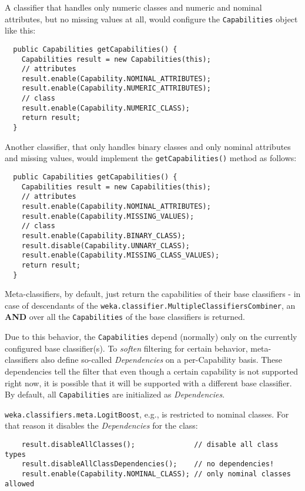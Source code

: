 \newpage
{}
A classifier that handles only numeric classes and numeric and nominal
attributes, but no missing values at all, would configure the
\texttt{Capabilities} object like this:
\begin{verbatim}
  public Capabilities getCapabilities() {
    Capabilities result = new Capabilities(this);
    // attributes
    result.enable(Capability.NOMINAL_ATTRIBUTES);
    result.enable(Capability.NUMERIC_ATTRIBUTES);
    // class
    result.enable(Capability.NUMERIC_CLASS);
    return result;
  }
\end{verbatim}
Another classifier, that only handles binary classes and only nominal
attributes and missing values, would implement the \texttt{getCapabilities()}
method as follows:
\begin{verbatim}
  public Capabilities getCapabilities() {
    Capabilities result = new Capabilities(this);
    // attributes
    result.enable(Capability.NOMINAL_ATTRIBUTES);
    result.enable(Capability.MISSING_VALUES);
    // class
    result.enable(Capability.BINARY_CLASS);
    result.disable(Capability.UNNARY_CLASS);
    result.enable(Capability.MISSING_CLASS_VALUES);
    return result;
  }
\end{verbatim}

Meta-classifiers, by default, just return the capabilities of their base
classifiers - in case of descendants of the
\texttt{weka.classifier.MultipleClassifiersCombiner}, an \textbf{AND} over all
the \texttt{Capabilities} of the base classifiers is returned.

Due to this behavior, the \texttt{Capabilities} depend (normally) only on the
currently configured base classifier(s). To \textit{soften} filtering for
certain behavior, meta-classifiers also define so-called \textit{Dependencies}
on a per-Capability basis. These dependencies tell the filter that even though a
certain capability is not supported right now, it is possible that it will be
supported with a different base classifier. By default, all
\texttt{Capabilities} are initialized as \textit{Dependencies}.

\texttt{weka.classifiers.meta.LogitBoost}, e.g., is restricted to nominal
classes. For that reason it disables the \textit{Dependencies} for the class:
{\small \begin{verbatim}
    result.disableAllClasses();              // disable all class types
    result.disableAllClassDependencies();    // no dependencies!
    result.enable(Capability.NOMINAL_CLASS); // only nominal classes allowed
\end{verbatim}}

